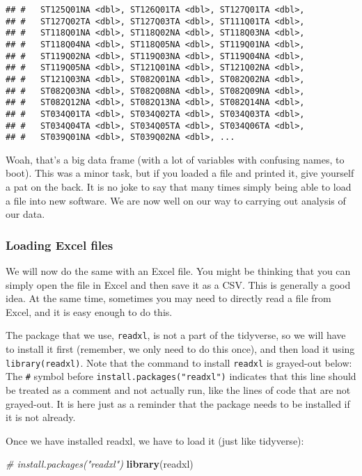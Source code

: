 \documentclass[]{article}
\newenvironment{Shaded}{\begin{snugshade}}{\end{snugshade}}
\newcommand{\KeywordTok}[1]{\textcolor[rgb]{0.13,0.29,0.53}{\textbf{#1}}}
\newcommand{\CommentTok}[1]{\textcolor[rgb]{0.56,0.35,0.01}{\textit{#1}}}
\newcommand{\NormalTok}[1]{#1}
\begin{document}
\begin{verbatim}
## #   ST125Q01NA <dbl>, ST126Q01TA <dbl>, ST127Q01TA <dbl>,
## #   ST127Q02TA <dbl>, ST127Q03TA <dbl>, ST111Q01TA <dbl>,
## #   ST118Q01NA <dbl>, ST118Q02NA <dbl>, ST118Q03NA <dbl>,
## #   ST118Q04NA <dbl>, ST118Q05NA <dbl>, ST119Q01NA <dbl>,
## #   ST119Q02NA <dbl>, ST119Q03NA <dbl>, ST119Q04NA <dbl>,
## #   ST119Q05NA <dbl>, ST121Q01NA <dbl>, ST121Q02NA <dbl>,
## #   ST121Q03NA <dbl>, ST082Q01NA <dbl>, ST082Q02NA <dbl>,
## #   ST082Q03NA <dbl>, ST082Q08NA <dbl>, ST082Q09NA <dbl>,
## #   ST082Q12NA <dbl>, ST082Q13NA <dbl>, ST082Q14NA <dbl>,
## #   ST034Q01TA <dbl>, ST034Q02TA <dbl>, ST034Q03TA <dbl>,
## #   ST034Q04TA <dbl>, ST034Q05TA <dbl>, ST034Q06TA <dbl>,
## #   ST039Q01NA <dbl>, ST039Q02NA <dbl>, ...
\end{verbatim}

Woah, that's a big data frame (with a lot of variables with confusing
names, to boot). This was a minor task, but if you loaded a file and
printed it, give yourself a pat on the back. It is no joke to say that
many times simply being able to load a file into new software. We are
now well on our way to carrying out analysis of our data.

\subsubsection{Loading Excel files}\label{loading-excel-files}

We will now do the same with an Excel file. You might be thinking that
you can simply open the file in Excel and then save it as a CSV. This is
generally a good idea. At the same time, sometimes you may need to
directly read a file from Excel, and it is easy enough to do this.

The package that we use, \texttt{readxl}, is not a part of the
tidyverse, so we will have to install it first (remember, we only need
to do this once), and then load it using \texttt{library(readxl)}. Note
that the command to install \texttt{readxl} is grayed-out below: The
\texttt{\#} symbol before \texttt{install.packages("readxl")} indicates
that this line should be treated as a comment and not actually run, like
the lines of code that are not grayed-out. It is here just as a reminder
that the package needs to be installed if it is not already.

Once we have installed readxl, we have to load it (just like tidyverse):

\begin{Shaded}
\begin{Highlighting}[]
\CommentTok{# install.packages("readxl")}
\KeywordTok{library}\NormalTok{(readxl)}
\end{Highlighting}
\end{Shaded}
\end{document}
